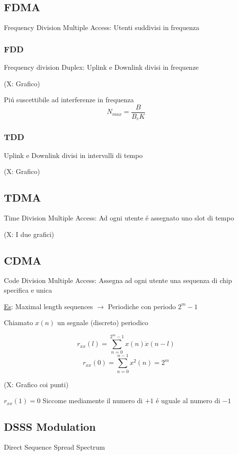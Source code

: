 \documentclass{article}
\begin{document}
\subsection{FDMA}
Frequency Division Multiple Access: Utenti suddivisi in frequenza
\subsubsection{FDD}
Frequency division Duplex: Uplink e Downlink divisi in frequenze

(X: Grafico)

Pi\'u suscettibile ad interferenze in frequenza
\[ N_{\textit{max}} = \frac{B}{B_c K} \]

\subsubsection{TDD}
Uplink e Downlink divisi in intervalli di tempo

(X: Grafico)

\subsection{TDMA}
Time Division Multiple Access: Ad ogni utente \'e assegnato uno slot di tempo

(X: I due grafici)

\subsection{CDMA}
Code Division Multiple Access: Assegna ad ogni utente una sequenza di chip specifica e unica

\underline{Es}: Maximal length sequences $\rightarrow$ Periodiche con periodo $2^m -1$

Chiamato $x(n)$ un segnale (discreto) periodico

\begin{minipage}{0.5\textwidth}
\[ r_{xx}(l) = \sum^{2^m-1}_{n=0}  x(n)\dot x(n -l)\]
\[ r_{xx}(0) = \sum^{n-1}_{n=0} x^2(n) = 2^m \]
\end{minipage}
\begin{minipage}{0.5\textwidth}
    (X: Grafico coi punti)
\end{minipage}

$r_{xx}(1)= 0$ Siccome mediamente il numero di $+1$ \'e uguale al numero di $-1$

\subsection{DSSS Modulation}
Direct Sequence Spread Spectrum
\end{document}
